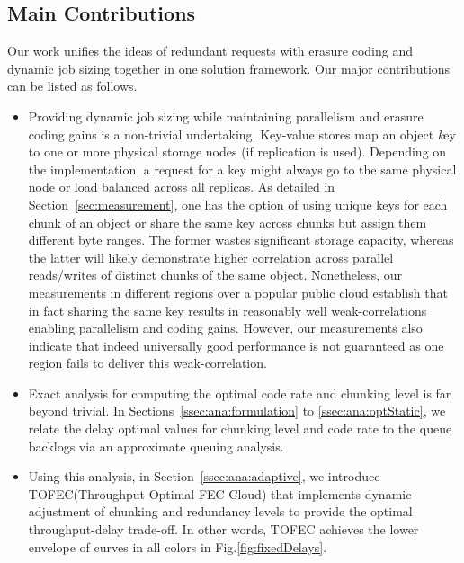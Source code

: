 \documentclass[journal]{IEEEtran}
\newcommand{\ourproposal}{TOFEC\xspace}
\begin{document}
\subsection{Main Contributions}
Our work unifies the ideas of redundant requests with erasure coding and dynamic job sizing together in one solution framework. Our major contributions can be listed as follows.
\begin{itemize}
\item Providing dynamic job sizing while maintaining parallelism and erasure coding gains is a non-trivial undertaking. Key-value stores map an object {\emph key} to one or more physical storage nodes (if replication is used). Depending on the implementation, a request for a key might always go to the same physical node or load balanced across all replicas. As detailed in Section~\ref{sec:measurement}, one has the option of using unique keys for each chunk of an object or share the same key across chunks but assign them different byte ranges. The former wastes significant storage capacity, whereas the latter will likely demonstrate higher correlation across parallel reads/writes of distinct chunks of the same object. Nonetheless, our measurements in different regions over a popular public cloud establish that in fact sharing the same key results in reasonably well weak-correlations enabling parallelism and coding gains. However, our measurements also indicate that indeed universally good performance is not guaranteed as one region fails to deliver this weak-correlation.

\item Exact analysis for computing the optimal code rate and chunking level is far beyond trivial. In Sections~\ref{ssec:ana:formulation} to \ref{ssec:ana:optStatic}, we relate the delay optimal values for chunking level and code rate to the queue backlogs via an approximate queuing analysis.

\item Using this analysis, in Section~\ref{ssec:ana:adaptive},  we introduce  \ourproposal (Throughput Optimal FEC Cloud) that implements dynamic adjustment of chunking and redundancy levels to provide the optimal throughput-delay trade-off. In other words, \ourproposal achieves the lower envelope of curves in all colors in Fig.\ref{fig:fixedDelays}.


\end{itemize}
\end{document}
